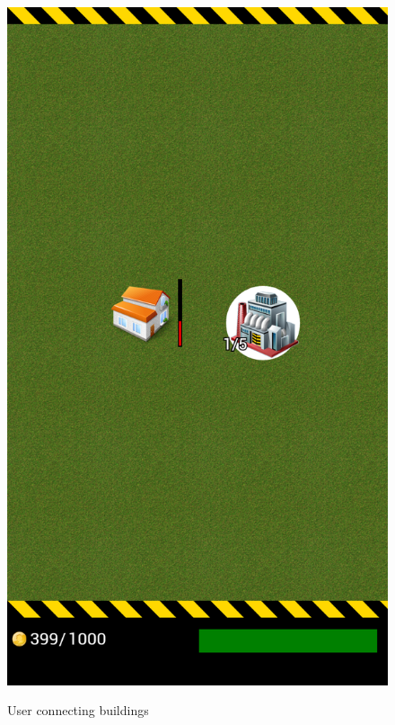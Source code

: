 \begin{figure}[H]
{			\includegraphics[scale=0.18]{pictures/sprint3-screen/buildPowerline_2.png}
		}
		\caption{User connecting buildings}
	\end{figure}
